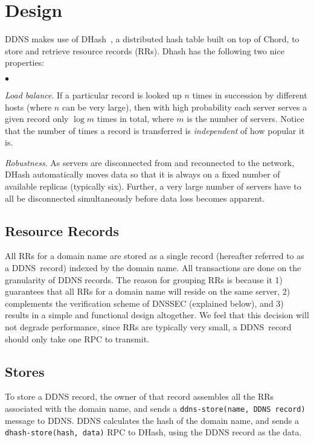 \section{Design}

DDNS makes use of
DHash~\cite{cfs:sosp01}, a distributed hash table
built on top of Chord, to store
and retrieve resource records (RRs).
Dhash has the following two nice properties:

\begin{list}{$\bullet$}{}
\item {\em Load balance}.
If a particular record is looked up $n$ times
in succession by different hosts (where $n$ can be very large),
then with high probability each server serves a given record 
only $\log{m}$ times in total, 
where $m$ is the number of servers. Notice that
the number of times a record is transferred is 
{\it independent} of how popular it is.

\item {\em Robustness}.
As servers are disconnected from and reconnected to the network,
DHash automatically moves data so that it is always on a fixed
number of available replicas (typically six).
Further, a very large number of servers have to
all be disconnected simultaneously before data loss
becomes apparent.
\end{list}

\subsection{Resource Records}

All RRs for a domain name are stored 
as a single record (hereafter referred to as a DDNS~record) 
indexed by the domain name.
All transactions are done on the granularity
of DDNS records. The reason for grouping RRs is because it 1)
guarantees that all RRs for a domain name will reside on
the same server, 2) complements the verification scheme
of DNSSEC (explained below), and 3) results in a simple
and functional design altogether. We feel that this decision 
will not degrade performance, since RRs are typically 
very small, a DDNS~record should only take one RPC to transmit.

\subsection{Stores}

To store a DDNS record, the owner of that record 
assembles all the RRs associated with the domain name,
and sends a {\tt ddns-store(name, DDNS~record)} message to DDNS. 
DDNS calculates the hash of the domain name, and sends
a {\tt dhash-store(hash, data)} RPC to DHash, using the
DDNS record as the data.

